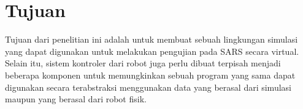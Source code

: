 \section{Tujuan}
\label{sec:Tujuan}

Tujuan dari penelitian ini adalah untuk membuat sebuah lingkungan simulasi yang dapat digunakan untuk melakukan pengujian pada SARS secara virtual.
Selain itu, sistem kontroler dari robot juga perlu dibuat terpisah menjadi beberapa komponen untuk memungkinkan sebuah program yang sama dapat digunakan secara terabstraksi menggunakan data yang berasal dari simulasi maupun yang berasal dari robot fisik.
